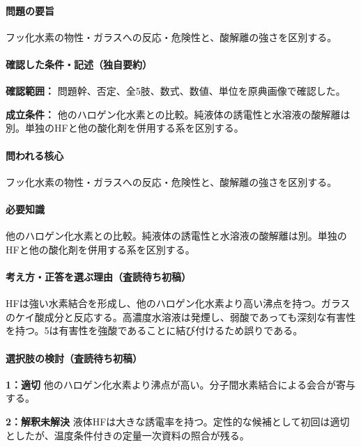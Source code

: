 \paragraph{問題の要旨} フッ化水素の物性・ガラスへの反応・危険性と、酸解離の強さを区別する。

\paragraph{確認した条件・記述（独自要約）}\mbox{}\par

\noindent\textbf{確認範囲：} 問題幹、否定、全5肢、数式、数値、単位を原典画像で確認した。\par

\noindent\textbf{成立条件：} 他のハロゲン化水素との比較。純液体の誘電性と水溶液の酸解離は別。単独のHFと他の酸化剤を併用する系を区別する。\par

\paragraph{問われる核心} フッ化水素の物性・ガラスへの反応・危険性と、酸解離の強さを区別する。

\paragraph{必要知識} 他のハロゲン化水素との比較。純液体の誘電性と水溶液の酸解離は別。単独のHFと他の酸化剤を併用する系を区別する。

\paragraph{考え方・正答を選ぶ理由（査読待ち初稿）} HFは強い水素結合を形成し、他のハロゲン化水素より高い沸点を持つ。ガラスのケイ酸成分と反応する。高濃度水溶液は発煙し、弱酸であっても深刻な有害性を持つ。5は有害性を強酸であることに結び付けるため誤りである。

\paragraph{選択肢の検討（査読待ち初稿）}\mbox{}\par

\noindent\textbf{1：適切} 他のハロゲン化水素より沸点が高い。分子間水素結合による会合が寄与する。\par

\noindent\textbf{2：解釈未解決} 液体HFは大きな誘電率を持つ。定性的な候補として初回は適切としたが、温度条件付きの定量一次資料の照合が残る。\par

